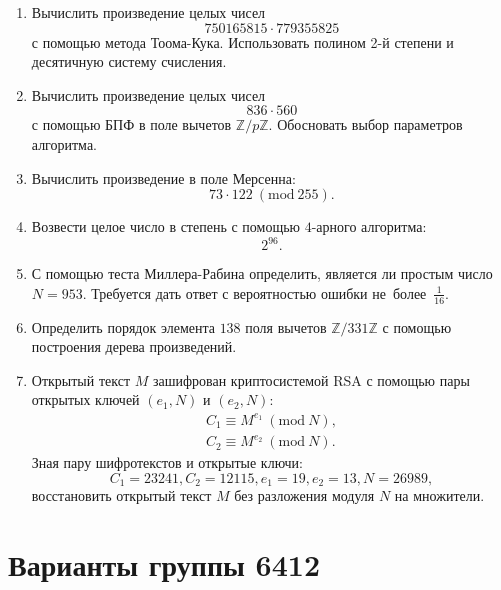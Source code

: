 \documentclass[14pt]{extarticle}
\begin{document}
	\begin{enumerate}
		\item Вычислить произведение целых чисел \[750165815 \cdot 779355825\] с помощью метода Тоома-Кука. Использовать полином 2-й степени и десятичную систему счисления.
		\item Вычислить произведение целых чисел \[836 \cdot 560\] с помощью БПФ в поле вычетов $\mathbb{Z}/p\mathbb{Z}$. Обосновать выбор параметров алгоритма.
		\item Вычислить произведение в поле Мерсенна: \[73 \cdot 122\ (\textrm{mod}\ 255).\]
		\item Возвести целое число в степень с помощью $4$-арного алгоритма: \[2^{96}.\]
		\item С помощью теста Миллера-Рабина определить, является ли простым число $N = 953$. Требуется дать ответ с вероятностью ошибки не~более~$\frac{1}{16}$.
		\item Определить порядок элемента $138$ поля вычетов $\mathbb{Z}/331\mathbb{Z}$ с помощью построения дерева произведений.
		\item Открытый текст $M$ зашифрован криптосистемой RSA с помощью пары открытых ключей $(e_1, N)$ и $(e_2, N)$:  \[\begin{aligned} C_1 \equiv M^{e_1}\ (\textrm{mod}\ N), \\ C_2 \equiv M^{e_2}\ (\textrm{mod}\ N). \end{aligned}\] Зная пару шифротекстов и открытые ключи: \[C_1 = 23241, C_2 = 12115, e_1 = 19, e_2 = 13, N = 26989,\] восстановить открытый текст $M$ без разложения модуля $N$ на множители.
	\end{enumerate}
\clearpage
	\section{Варианты группы 6412}
\end{document}
